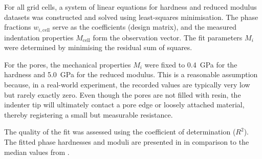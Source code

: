 For all  grid cells, a system of linear equations for hardness and reduced modulus datasets was constructed and solved using least-squares minimisation.
The phase fractions $w_{i,\text{cell}}$ serve as the coefficients (design matrix), and the measured indentation properties $M_{\text{cell}}$ form the observation vector.
The fit parameters $M_i$ were determined by minimising the residual sum of squares.

For the pores, the mechanical properties $M_i$ were fixed to \qty{0.4}{\giga\pascal} for the hardness and \qty{5.0}{\giga\pascal} for the reduced modulus.
This is a reasonable assumption because, in a real-world experiment, the recorded values are typically very low but rarely exactly zero.
Even though the pores are not filled with resin, the indenter tip will ultimately contact a pore edge or loosely attached material, thereby registering a small but measurable resistance.

The quality of the fit was assessed using the coefficient of determination ($R^2$).
The fitted phase hardnesses and moduli are presented in  in comparison to the median values from .

